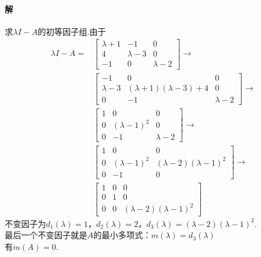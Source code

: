 \documentclass[12pt, a4paper, oneside, fontset=none]{ctexart}
\begin{document}
\paragraph*{解} 求$\lambda I - A$的初等因子组.由于
\begin{align*}
    \lambda I - A = & \begin{bmatrix}
                          \lambda + 1 & -1          & 0         \\
                          4           & \lambda - 3 & 0         \\
                          -1          & 0           & \lambda-2
                      \end{bmatrix} \to                      \\
                    & \begin{bmatrix}
                          -1          & 0                              & 0           \\
                          \lambda - 3 & (\lambda + 1)(\lambda - 3) + 4 & 0           \\
                          0           & -1                             & \lambda - 2
                      \end{bmatrix} \to \\
                    & \begin{bmatrix}
                          1 & 0               & 0           \\
                          0 & (\lambda - 1)^2 & 0           \\
                          0 & -1              & \lambda - 2
                      \end{bmatrix} \to                          \\
                    & \begin{bmatrix}
                          1 & 0               & 0                        \\
                          0 & (\lambda - 1)^2 & (\lambda-2)(\lambda-1)^2 \\
                          0 & -1              & 0
                      \end{bmatrix} \to             \\
                    & \begin{bmatrix}
                          1 & 0 & 0                         \\
                          0 & 1 & 0                         \\
                          0 & 0 & (\lambda -2)(\lambda-1)^2
                      \end{bmatrix}
\end{align*}
不变因子为$d_1(\lambda)=1$，$d_2(\lambda) = 2$，$d_3(\lambda) = (\lambda -2)(\lambda-1)^2.$\\
最后一个不变因子就是$A$的最小多项式：$m(\lambda) = d_3(\lambda)$\\
有$m(A) = 0.$
\end{document}
